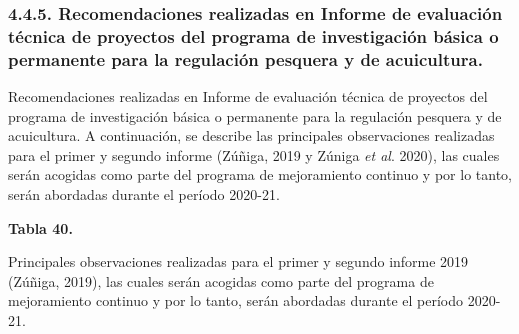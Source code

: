 \documentclass[
  spanish,
]{article}
\begin{document}
\normalsize

\pagebreak

\hypertarget{recomendaciones-realizadas-en-informe-de-evaluaciuxf3n-tuxe9cnica-de-proyectos-del-programa-de-investigaciuxf3n-buxe1sica-o-permanente-para-la-regulaciuxf3n-pesquera-y-de-acuicultura.}{%
\subsubsection{4.4.5. Recomendaciones realizadas en Informe de
evaluación técnica de proyectos del programa de investigación básica o
permanente para la regulación pesquera y de
acuicultura.}\label{recomendaciones-realizadas-en-informe-de-evaluaciuxf3n-tuxe9cnica-de-proyectos-del-programa-de-investigaciuxf3n-buxe1sica-o-permanente-para-la-regulaciuxf3n-pesquera-y-de-acuicultura.}}

Recomendaciones realizadas en Informe de evaluación técnica de proyectos
del programa de investigación básica o permanente para la regulación
pesquera y de acuicultura. A continuación, se describe las principales
observaciones realizadas para el primer y segundo informe (Zúñiga, 2019
y Zúniga \emph{et al}. 2020), las cuales serán acogidas como parte del
programa de mejoramiento continuo y por lo tanto, serán abordadas
durante el período 2020-21. \vspace{0.5cm}

\small
\begin{center} 
\textbf{Tabla 40.}
\end{center}
\begin{center} 
\vspace{-0.2cm} Principales observaciones realizadas para el primer y segundo informe 2019 (Zúñiga, 2019), las cuales serán acogidas como parte del programa de mejoramiento continuo y por lo tanto, serán abordadas durante el período 2020-21. 
\end{center}
\vspace{-0.2cm}
\end{document}
